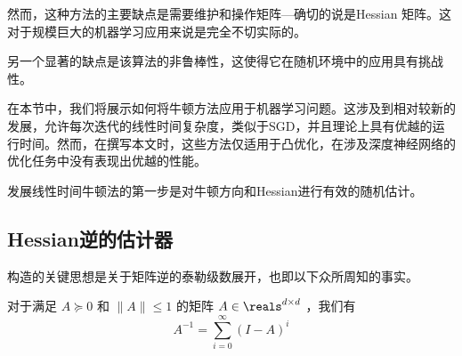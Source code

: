 然而，这种方法的主要缺点是需要维护和操作矩阵---确切的说是Hessian 矩阵。这对于规模巨大的机器学习应用来说是完全不切实际的。

另一个显著的缺点是该算法的非鲁棒性，这使得它在随机环境中的应用具有挑战性。

在本节中，我们将展示如何将牛顿方法应用于机器学习问题。这涉及到相对较新的发展，允许每次迭代的线性时间复杂度，类似于SGD，并且理论上具有优越的运行时间。然而，在撰写本文时，这些方法仅适用于凸优化，在涉及深度神经网络的优化任务中没有表现出优越的性能。

发展线性时间牛顿法的第一步是对牛顿方向和Hessian{}进行有效的随机估计。

\subsection{
    Hessian逆的估计器
    }
\label{sec:estimators}

构造的关键思想是关于矩阵逆的泰勒级数展开，也即以下众所周知的事实。
\begin{lemma}
\label{fact:inverse}
对于满足  $A \succeq 0 \text{ 和 } \|A\| \leq 1$ 的矩阵 $A \in \reals^{d\times d}$ ，我们有  \[ A^{-1} = \sum_{i=0}^{\infty} (I - A)^i\]
\end{lemma}


